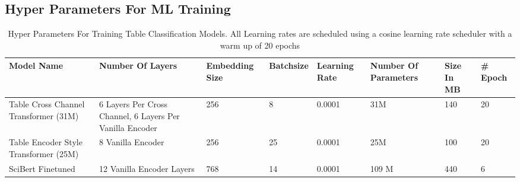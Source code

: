 \subsection{Hyper Parameters For ML Training}
\begin{table}[h]
  \label{table\arabic{tablecounter}}
  \centering
  \begin{tabular}{|p{1.25cm}|p{1.25cm}|p{1.75cm}|p{1.5cm}|p{1.5cm}|p{1.5cm}|p{1cm}|p{1cm}|}
  \hline
      Model Name & Number Of Layers &  Embedding Size & Batchsize & Learning Rate & Number Of Parameters & Size In MB & \# Epoch\\ \hline
      Table Cross Channel Transformer (31M) & 6 Layers Per Cross Channel, 6 Layers Per Vanilla Encoder & 256 & 8 & 0.0001 & 31M & 140 & 20\\ \hline
      Table Encoder Style Transformer (25M) & 8 Vanilla Encoder & 256 & 25 & 0.0001 & 25M & 100 & 20\\ \hline
      SciBert Finetuned & 12 Vanilla Encoder Layers & 768 & 14 & 0.0001 & 109 M & 440 & 6 \\ \hline
  \end{tabular}
  \caption{\label{tablecounter} Hyper Parameters For Training Table Classification Models. All Learning rates are scheduled using a cosine learning rate scheduler with a warm up of 20 epochs }
\end{table}
